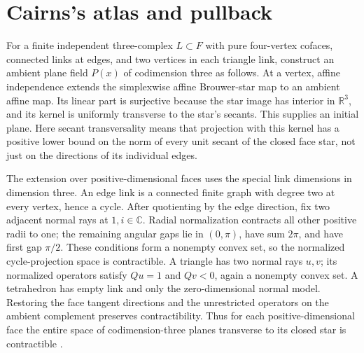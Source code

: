 \section{Cairns's atlas and pullback}
\label{sec:cairns-pullback}

For a finite independent three-complex $L\subset F$ with pure four-vertex
cofaces, connected links at edges, and two vertices in each triangle link,
construct an ambient plane field $P(x)$ of codimension three as follows.
At a vertex, affine independence extends the simplexwise affine
Brouwer-star map to an ambient affine map. Its linear part is surjective
because the star image has interior in $\mathbb R^3$, and its kernel is
uniformly transverse to the star's secants. This supplies an initial
plane. Here secant transversality means that projection with this kernel
has a positive lower bound on the norm of every unit secant of the
closed face star, not just on the directions of its individual edges.

The extension over positive-dimensional faces uses the special link
dimensions in dimension three. An edge link is a connected finite graph
with degree two at every vertex, hence a cycle. After quotienting by the
edge direction, fix two adjacent normal rays at $1,i\in\mathbb C$.
Radial normalization contracts all other positive radii to one; the
remaining angular gaps lie in $(0,\pi)$, have sum $2\pi$, and have
first gap $\pi/2$. These conditions form a nonempty convex set, so the
normalized cycle-projection space is contractible. A triangle has two
normal rays $u,v$; its normalized operators satisfy $Qu=1$ and $Qv<0$,
again a nonempty convex set. A tetrahedron has empty link and only the
zero-dimensional normal model. Restoring the face tangent directions
and the unrestricted operators on the ambient complement preserves
contractibility. Thus for each positive-dimensional face the entire
space of codimension-three planes transverse to its closed star is
contractible \cite[Sections 4--5 and 11, pp.~800--802, 807]{Cairns1940}.

